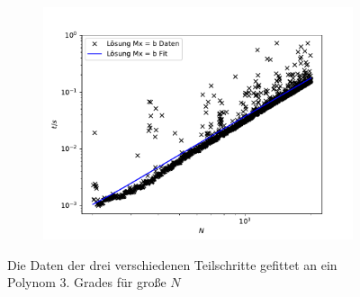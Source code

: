 \documentclass{scrartcl}
\begin{document}
\begin{figure}[h!]
\begin{subfigure}{0.3\textwidth}
		\includegraphics[width=\textwidth]{A2/build/t3_200.pdf}
		\end{subfigure}
		\caption{Die Daten der drei verschiedenen Teilschritte gefittet an ein Polynom 3. Grades für große $N$}
		\label{fig:fit}
 		\end{figure}
\end{document}
